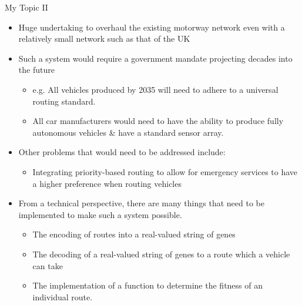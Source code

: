 \documentclass{beamer}
\begin{document}
\begin{frame}{My Topic II}

    \begin{itemize}
        \item Huge undertaking to overhaul the existing motorway network even with a relatively small network such as that of the UK
        \item Such a system would require a government mandate projecting decades into the future
            \begin{itemize}
                \item e.g. All vehicles produced by 2035 will need to adhere to a universal routing standard.
                \item All car manufacturers would need to have the ability to produce fully autonomous vehicles \& have a standard sensor array.
            \end{itemize}
        \item Other problems that would need to be addressed include:
            \begin{itemize}
                \item Integrating priority-based routing to allow for emergency services to have a higher preference when routing vehicles
            \end{itemize}
        \item From a technical perspective, there are many things that need to be implemented to make such a system possible. 
            \begin{itemize}
                \item The encoding of routes into a real-valued string of genes
                \item The decoding of a real-valued string of genes to a route which a vehicle can take
                \item The implementation of a function to determine the fitness of an individual route. 
            \end{itemize}
    \end{itemize}

\end{frame}
\end{document}
